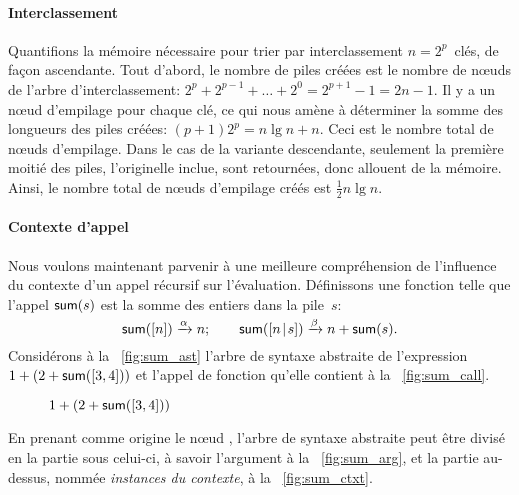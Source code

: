 \paragraph{Interclassement}

Quantifions la mémoire nécessaire pour trier par interclassement
\(n=2^p\)~clés, de façon ascendante. Tout d'abord, le nombre de piles
créées est le nombre de nœuds de l'arbre d'interclassement: \(2^p
+ 2^{p-1} + \ldots + 2^0 = 2^{p+1}-1 = 2n - 1\). Il y a un nœud
d'empilage pour chaque clé, ce qui nous
amène à déterminer la somme des longueurs des piles créées: \((p+1)2^p
= n\lg n + n\). Ceci est le nombre total de nœuds d'empilage. Dans
le cas de la variante descendante, seulement la première moitié des
piles, l'originelle inclue, sont retournées, donc allouent de la
mémoire. Ainsi, le nombre total de nœuds d'empilage créés est
\(\tfrac{1}{2}n\lg n\).


\paragraph{Contexte d'appel}

Nous voulons maintenant parvenir à une meilleure compréhension de
l'influence du contexte d'un appel récursif sur
l'évaluation. Définissons une fonction  telle que l'appel
\(\textsf{sum}(s)\) est la somme des entiers dans la pile~\(s\):
\begin{equation*}
\textsf{sum}([n]) \xrightarrow{\smash{\alpha}} n;\qquad
\textsf{sum}([{n}\!\mid\!{s}]) \xrightarrow{\smash{\beta}} n + \textsf{sum}(s).
\end{equation*}
Considérons à la \fig~\vref{fig:sum_ast} l'arbre de syntaxe abstraite
de l'expression \(1+(2+\textsf{sum}([3,4]))\) et l'appel de fonction
qu'elle contient à la \fig~\ref{fig:sum_call}.
\begin{figure}
\centering
{}
\qquad
{}
\quad
{}
\qquad
{}
\caption{\(1+(2+\textsf{sum}([3,4]))\)}
\end{figure}
En prenant comme origine le nœud , l'arbre de syntaxe
abstraite peut être divisé en la partie sous celui-ci, à savoir
l'argument à la \fig~\ref{fig:sum_arg}, et la partie au-dessus, nommée
\emph{instances du contexte}, à la \fig~\ref{fig:sum_ctxt}.


